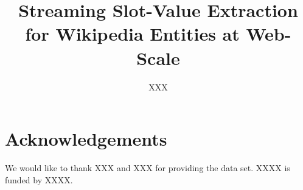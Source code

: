 \documentclass[letterpaper]{article}
\newcommand\hide[2]{#2}
\begin{document}
\title{Streaming Slot-Value Extraction for Wikipedia Entities at Web-Scale}





\author{XXX}



\maketitle







%





%

\section*{Acknowledgements}
We would like to thank \hide{John Frank}{XXX} and \hide{NIST}{XXX} for providing the data set.
\hide{Christan Grant}{XXXX} is funded by \hide{a National Science Foundation Graduate Research Fellowship under Grant No. DGE-0802270}{XXXX}. 

%
%




%
\end{document}
